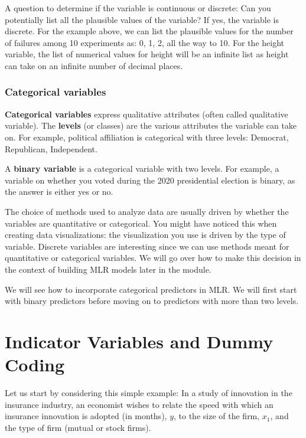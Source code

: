 \documentclass[
]{book}
\begin{document}
A question to determine if the variable is continuous or discrete: Can you potentially list all the plausible values of the variable? If yes, the variable is discrete. For the example above, we can list the plausible values for the number of failures among 10 experiments as: 0, 1, 2, all the way to 10. For the height variable, the list of numerical values for height will be an infinite list as height can take on an infinite number of decimal places.

\hypertarget{categorical-variables}{%
\subsubsection{Categorical variables}\label{categorical-variables}}

\textbf{Categorical variables} express qualitative attributes (often called qualitative variable). The \textbf{levels} (or classes) are the various attributes the variable can take on. For example, political affiliation is categorical with three levels: Democrat, Republican, Independent.

A \textbf{binary variable} is a categorical variable with two levels. For example, a variable on whether you voted during the 2020 presidential election is binary, as the answer is either yes or no.

The choice of methods used to analyze data are usually driven by whether the variables are quantitative or categorical. You might have noticed this when creating data visualizations: the visualization you use is driven by the type of variable. Discrete variables are interesting since we can use methods meant for quantitative or categorical variables. We will go over how to make this decision in the context of building MLR models later in the module.

We will see how to incorporate categorical predictors in MLR. We will first start with binary predictors before moving on to predictors with more than two levels.

\hypertarget{indicator-variables-and-dummy-coding}{%
\section{Indicator Variables and Dummy Coding}\label{indicator-variables-and-dummy-coding}}

Let us start by considering this simple example: In a study of innovation in the insurance industry, an economist wishes to relate the speed with which an insurance innovation is
adopted (in months), \(y\), to the size of the firm, \(x_1\), and the type of firm (mutual or stock firms).
\end{document}

